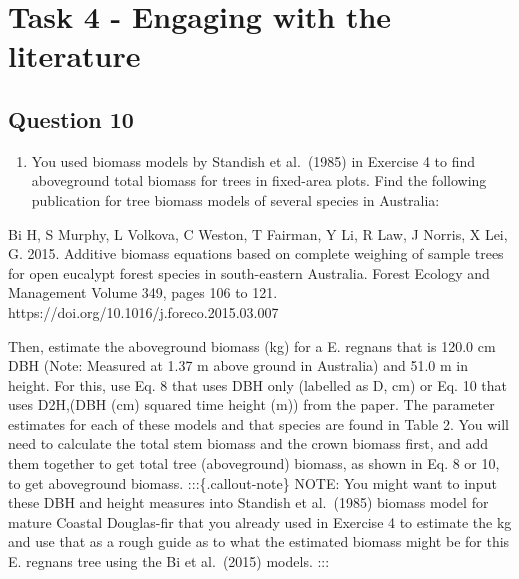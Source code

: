 \documentclass[
  letterpaper,
]{book}
\providecommand{\tightlist}{%
  \setlength{\itemsep}{0pt}\setlength{\parskip}{0pt}}\usepackage{longtable,booktabs,array}
\begin{document}
\hypertarget{task-4---engaging-with-the-literature}{%
\section{Task 4 - Engaging with the
literature}\label{task-4---engaging-with-the-literature}}

\hypertarget{question-10-3}{%
\subsection*{Question 10}\label{question-10-3}}

\begin{enumerate}
\def\labelenumi{\arabic{enumi}.}
\tightlist
\item
  You used biomass models by Standish et al.~(1985) in Exercise 4 to
  find aboveground total biomass for trees in fixed-area plots. Find the
  following publication for tree biomass models of several species in
  Australia:
\end{enumerate}

\begin{tcolorbox}[enhanced jigsaw, colbacktitle=quarto-callout-tip-color!10!white, leftrule=.75mm, left=2mm, opacitybacktitle=0.6, breakable, colframe=quarto-callout-tip-color-frame, arc=.35mm, bottomtitle=1mm, rightrule=.15mm, title={Search the Literature}, toptitle=1mm, titlerule=0mm, opacityback=0, coltitle=black, colback=white, bottomrule=.15mm, toprule=.15mm]

Bi H, S Murphy, L Volkova, C Weston, T Fairman, Y Li, R Law, J Norris, X
Lei, G. 2015. Additive biomass equations based on complete weighing of
sample trees for open eucalypt forest species in south-eastern
Australia. Forest Ecology and Management Volume 349, pages 106 to 121.
https://doi.org/10.1016/j.foreco.2015.03.007

\end{tcolorbox}

Then, estimate the aboveground biomass (kg) for a E. regnans that is
120.0 cm DBH (Note: Measured at 1.37 m above ground in Australia) and
51.0 m in height. For this, use Eq. 8 that uses DBH only (labelled as D,
cm) or Eq. 10 that uses D2H,(DBH (cm) squared time height (m)) from the
paper. The parameter estimates for each of these models and that species
are found in Table 2. You will need to calculate the total stem biomass
and the crown biomass first, and add them together to get total tree
(aboveground) biomass, as shown in Eq. 8 or 10, to get aboveground
biomass. :::\{.callout-note\} NOTE: You might want to input these DBH
and height measures into Standish et al.~(1985) biomass model for mature
Coastal Douglas-fir that you already used in Exercise 4 to estimate the
kg and use that as a rough guide as to what the estimated biomass might
be for this E. regnans tree using the Bi et al.~(2015) models. :::
\end{document}
